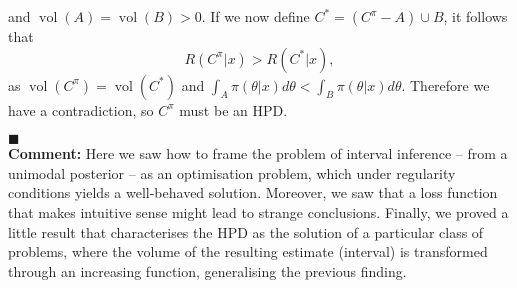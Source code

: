 {\begin{enumerate}[label = \alph*)]
\begin{equation*}
    \end{equation*}
    and $\operatorname{vol}(A) = \operatorname{vol}(B) > 0$. If we now define $C^* = (C^\pi - A) \cup B$, it follows that
    \begin{equation*}
        R(C^\pi|x) > R(C^*|x),
    \end{equation*}
    as $\operatorname{vol}(C^\pi) = \operatorname{vol}(C^*)$ and $\int_A \pi(\theta|x) d\theta < \int_B \pi(\theta|x) d\theta$. Therefore we have a contradiction, so $C^\pi$ must be an HPD.
\end{enumerate}
$\blacksquare$\\
\textbf{Comment:} Here we saw how to frame the problem of interval inference -- from a unimodal posterior -- as an optimisation problem, which under regularity conditions yields a well-behaved solution.
Moreover, we saw that a loss function that makes intuitive sense might lead to strange conclusions.
Finally, we proved a little result that characterises the HPD as the solution of a particular class of problems, where the volume of the resulting estimate (interval) is transformed through an increasing function, generalising the previous finding.
}